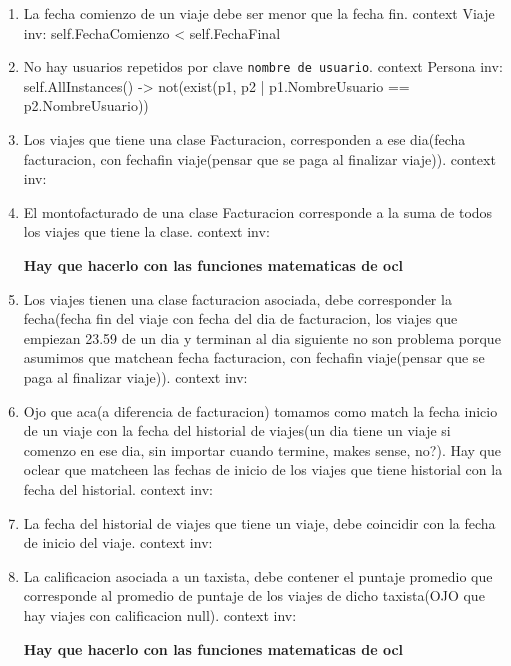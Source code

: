 \begin{enumerate}
	\item \begin{ocl}{La fecha comienzo de un viaje debe ser menor que la fecha fin.}
		  context Viaje
		  inv: self.FechaComienzo < self.FechaFinal
		\end{ocl}

	\item \begin{ocl}{No hay usuarios repetidos por clave \texttt{nombre de usuario}.}
		  context Persona
		  inv: self.AllInstances() -> not(exist(p1, p2 | p1.NombreUsuario == p2.NombreUsuario))
		\end{ocl}	

	\item \begin{ocl}{Los viajes que tiene una clase Facturacion, corresponden a ese dia(fecha facturacion, con fechafin viaje(pensar que se paga al finalizar viaje)).}
		  context 
		  inv: 
		\end{ocl}

	\item \begin{ocl}{El montofacturado de una clase Facturacion corresponde a la suma de todos los viajes que tiene la clase.}
		  context 
		  inv: 
		\end{ocl}
		\textbf{Hay que hacerlo con las funciones matematicas de ocl}

	\item \begin{ocl}{Los viajes tienen una clase facturacion asociada, debe corresponder la fecha(fecha fin del viaje con fecha del dia de facturacion, los viajes que empiezan 23.59 de un dia y terminan al dia siguiente no son problema porque asumimos que matchean fecha facturacion, con fechafin viaje(pensar que se paga al finalizar viaje)).}
		  context 
		  inv: 
		\end{ocl}

	\item \begin{ocl}{Ojo que aca(a diferencia de facturacion) tomamos como match la fecha inicio de un viaje con la fecha del historial de viajes(un dia tiene un viaje si comenzo en ese dia, sin importar cuando termine, makes sense, no?). Hay que oclear que matcheen las fechas de inicio de los viajes que tiene historial con la fecha del historial.}
		  context 
		  inv: 
		\end{ocl}

	\item \begin{ocl}{La fecha del historial de viajes que tiene un viaje, debe coincidir con la fecha de inicio del viaje.}
		  context 
		  inv: 
		\end{ocl}

	\item \begin{ocl}{La calificacion asociada a un taxista, debe contener el puntaje promedio que corresponde al promedio de puntaje de los viajes de dicho taxista(OJO que hay viajes con calificacion null).}
		  context 
		  inv: 
		\end{ocl}
		\textbf{Hay que hacerlo con las funciones matematicas de ocl}

\end{enumerate}

